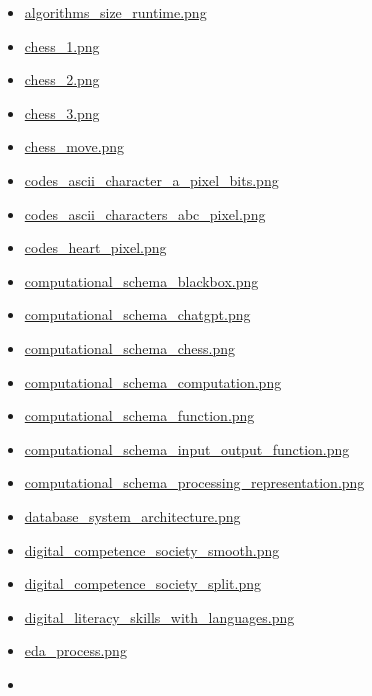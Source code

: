 \documentclass[
  letterpaper,
  DIV=11]{scrartcl}
\providecommand{\tightlist}{%
  \setlength{\itemsep}{0pt}\setlength{\parskip}{0pt}}\usepackage{longtable,booktabs,array}
\begin{document}
\begin{itemize}
\tightlist
\item
  \href{images/algorithms_size_runtime.png}{algorithms\_size\_runtime.png}
\item
  \href{images/chess_1.png}{chess\_1.png}
\item
  \href{images/chess_2.png}{chess\_2.png}
\item
  \href{images/chess_3.png}{chess\_3.png}
\item
  \href{images/chess_move.png}{chess\_move.png}
\item
  \href{images/codes_ascii_character_a_pixel_bits.png}{codes\_ascii\_character\_a\_pixel\_bits.png}
\item
  \href{images/codes_ascii_characters_abc_pixel.png}{codes\_ascii\_characters\_abc\_pixel.png}
\item
  \href{images/codes_heart_pixel.png}{codes\_heart\_pixel.png}
\item
  \href{images/computational_schema_blackbox.png}{computational\_schema\_blackbox.png}
\item
  \href{images/computational_schema_chatgpt.png}{computational\_schema\_chatgpt.png}
\item
  \href{images/computational_schema_chess.png}{computational\_schema\_chess.png}
\item
  \href{images/computational_schema_computation.png}{computational\_schema\_computation.png}
\item
  \href{images/computational_schema_function.png}{computational\_schema\_function.png}
\item
  \href{images/computational_schema_input_output_function.png}{computational\_schema\_input\_output\_function.png}
\item
  \href{images/computational_schema_processing_representation.png}{computational\_schema\_processing\_representation.png}
\item
  \href{images/database_system_architecture.png}{database\_system\_architecture.png}
\item
  \href{images/digital_competence_society_smooth.png}{digital\_competence\_society\_smooth.png}
\item
  \href{images/digital_competence_society_split.png}{digital\_competence\_society\_split.png}
\item
  \href{images/digital_literacy_skills_with_languages.png}{digital\_literacy\_skills\_with\_languages.png}
\item
  \href{images/eda_process.png}{eda\_process.png}
\item

\end{itemize}
\end{document}
